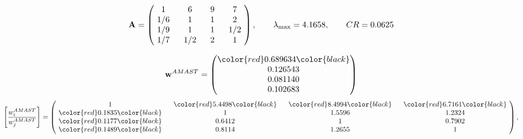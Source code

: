 \begin{example}
\begin{equation*}
\mathbf{A} =
\begin{pmatrix}
$\,\,$ 1 $\,\,$ & $\,\,$6$\,\,$ & $\,\,$9$\,\,$ & $\,\,$7 $\,\,$ \\
$\,\,$ 1/6$\,\,$ & $\,\,$ 1 $\,\,$ & $\,\,$1$\,\,$ & $\,\,$2 $\,\,$ \\
$\,\,$ 1/9$\,\,$ & $\,\,$ 1 $\,\,$ & $\,\,$ 1 $\,\,$ & $\,\,$ 1/2 $\,\,$ \\
$\,\,$ 1/7$\,\,$ & $\,\,$ 1/2$\,\,$ & $\,\,$2$\,\,$ & $\,\,$ 1  $\,\,$ \\
\end{pmatrix},
\qquad
\lambda_{\max} =
4.1658,
\qquad
CR = 0.0625
\end{equation*}

\begin{equation*}
\mathbf{w}^{AMAST} =
\begin{pmatrix}
\color{red} 0.689634\color{black} \\
0.126543\\
0.081140\\
0.102683
\end{pmatrix}\end{equation*}
\begin{equation*}
\left[ \frac{{w}^{AMAST}_i}{{w}^{AMAST}_j} \right] =
\begin{pmatrix}
$\,\,$ 1 $\,\,$ & $\,\,$\color{red} 5.4498\color{black} $\,\,$ & $\,\,$\color{red} 8.4994\color{black} $\,\,$ & $\,\,$\color{red} 6.7161\color{black} $\,\,$ \\
$\,\,$\color{red} 0.1835\color{black} $\,\,$ & $\,\,$ 1 $\,\,$ & $\,\,$1.5596$\,\,$ & $\,\,$1.2324  $\,\,$ \\
$\,\,$\color{red} 0.1177\color{black} $\,\,$ & $\,\,$0.6412$\,\,$ & $\,\,$ 1 $\,\,$ & $\,\,$0.7902 $\,\,$ \\
$\,\,$\color{red} 0.1489\color{black} $\,\,$ & $\,\,$0.8114$\,\,$ & $\,\,$1.2655$\,\,$ & $\,\,$ 1  $\,\,$ \\
\end{pmatrix},
\end{equation*}


\end{example}
